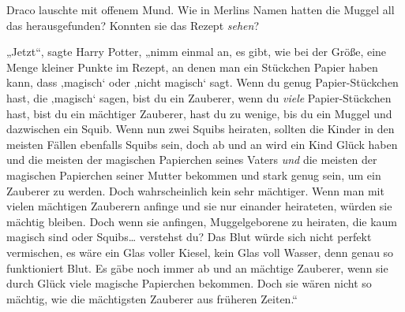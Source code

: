 Draco lauschte mit offenem Mund. Wie in Merlins Namen hatten die Muggel all das herausgefunden? Konnten sie das Rezept \emph{sehen}?

„Jetzt“, sagte Harry Potter, „nimm einmal an, es gibt, wie bei der Größe, eine Menge kleiner Punkte im Rezept, an denen man ein Stückchen Papier haben kann, dass ‚magisch‘ oder ‚nicht magisch‘ sagt. Wenn du genug Papier-Stückchen hast, die ‚magisch‘ sagen, bist du ein Zauberer, wenn du \emph{viele} Papier-Stückchen hast, bist du ein mächtiger Zauberer, hast du zu wenige, bis du ein Muggel und dazwischen ein Squib. Wenn nun zwei Squibs heiraten, sollten die Kinder in den meisten Fällen ebenfalls Squibs sein, doch ab und an wird ein Kind Glück haben und die meisten der magischen Papierchen seines Vaters \emph{und} die meisten der magischen Papierchen seiner Mutter bekommen und stark genug sein, um ein Zauberer zu werden. Doch wahrscheinlich kein sehr mächtiger. Wenn man mit vielen mächtigen Zauberern anfinge und sie nur einander heirateten, würden sie mächtig bleiben. Doch wenn sie anfingen, Muggelgeborene zu heiraten, die kaum magisch sind oder Squibs… verstehst du? Das Blut würde sich nicht perfekt vermischen, es wäre ein Glas voller Kiesel, kein Glas voll Wasser, denn genau so funktioniert Blut. Es gäbe noch immer ab und an mächtige Zauberer, wenn sie durch Glück viele magische Papierchen bekommen. Doch sie wären nicht so mächtig, wie die mächtigsten Zauberer aus früheren Zeiten.“

